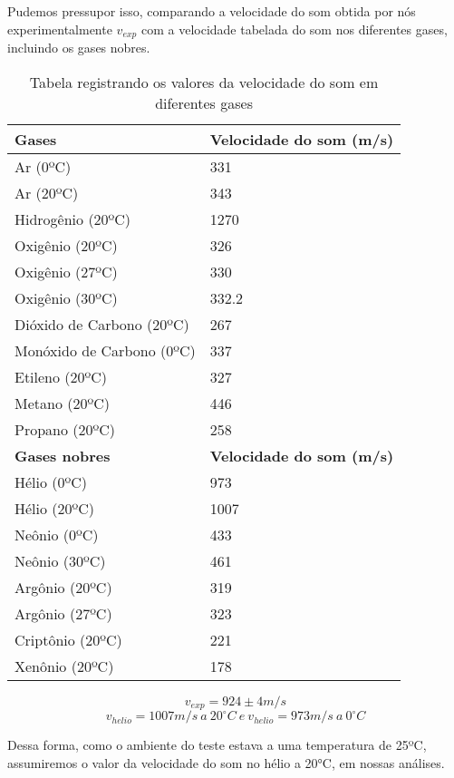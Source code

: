 Pudemos pressupor isso, comparando a velocidade do som obtida por nós experimentalmente $v_{exp}$ com a velocidade tabelada do som nos diferentes gases, incluindo os gases nobres.

\begin{table}[H]
    \centering
    \begin{tabular}{ |M{7cm}||M{7cm}|  }
        \hline
        \textbf{Gases} & \textbf{Velocidade do som (m/s)}\\
        \hline 
        Ar (0ºC) & 331 \\
        Ar (20ºC) & 343 \\
        Hidrogênio (20ºC) & 1270\\
        Oxigênio (20ºC) & 326\\
        Oxigênio (27ºC) & 330\\
        Oxigênio (30ºC) & 332.2\\
        Dióxido de Carbono (20ºC) & 267\\
        Monóxido de Carbono (0ºC) & 337\\
        Etileno (20ºC) & 327\\
        Metano (20ºC) & 446\\
        Propano (20ºC) & 258\\
        \hline
        \textbf{Gases nobres} & \textbf{Velocidade do som (m/s)} \\
        \hline
        Hélio (0ºC) & 973\\
        Hélio (20ºC) & 1007\\
        Neônio (0ºC) & 433\\
        Neônio (30ºC) & 461\\
        Argônio (20ºC) & 319\\
        Argônio (27ºC) & 323\\
        Criptônio (20ºC) & 221\\
        Xenônio (20ºC) & 178\\
        \hline
    \end{tabular}
    \caption{Tabela registrando os valores da velocidade do som em diferentes gases}
\end{table}

\[v_{exp} = 924 \pm 4 m/s\]
\[v_{helio} = 1007 m/s \  a \ 20^\circ C \  e  \  v_{helio} = 973 m/s\ a \ 0^\circ C\]

Dessa forma, como o ambiente do teste estava a uma temperatura de 25ºC, assumiremos o valor da velocidade do som no hélio a 20°C, em nossas análises.

